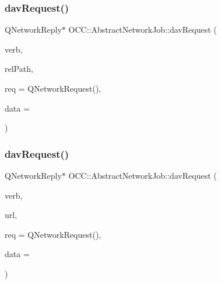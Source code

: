 \subsubsection{\texorpdfstring{dav\+Request()}{davRequest()}\hspace{0.1cm}{\footnotesize\ttfamily [1/2]}}
{\footnotesize\ttfamily Q\+Network\+Reply$\ast$ O\+C\+C\+::\+Abstract\+Network\+Job\+::dav\+Request (\begin{DoxyParamCaption}\item[{const Q\+Byte\+Array \&}]{verb,  }\item[{const Q\+String \&}]{rel\+Path,  }\item[{Q\+Network\+Request}]{req = {\ttfamily QNetworkRequest()},  }\item[{Q\+I\+O\+Device $\ast$}]{data = {} }\end{DoxyParamCaption})\hspace{0.3cm}{\ttfamily [protected]}}

\mbox{\label{class_o_c_c_1_1_abstract_network_job_a3110a1a51bb94c92449d758e0f9285bd}} 
\subsubsection{\texorpdfstring{dav\+Request()}{davRequest()}\hspace{0.1cm}{\footnotesize\ttfamily [2/2]}}
{\footnotesize\ttfamily Q\+Network\+Reply$\ast$ O\+C\+C\+::\+Abstract\+Network\+Job\+::dav\+Request (\begin{DoxyParamCaption}\item[{const Q\+Byte\+Array \&}]{verb,  }\item[{const Q\+Url \&}]{url,  }\item[{Q\+Network\+Request}]{req = {\ttfamily QNetworkRequest()},  }\item[{Q\+I\+O\+Device $\ast$}]{data = {} }\end{DoxyParamCaption})\hspace{0.3cm}{\ttfamily [protected]}}

\mbox{\label{class_o_c_c_1_1_abstract_network_job_ab1d23aa2b82cf666a6f629863f487a92}} 
